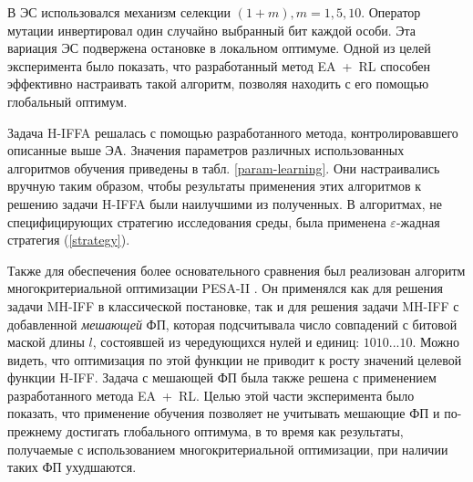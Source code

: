 В ЭС использовался механизм селекции $(1 + m), m = 1, 5, 10.$ Оператор мутации инвертировал один случайно выбранный бит каждой особи. Эта вариация ЭС подвержена остановке в локальном оптимуме. Одной из целей эксперимента было показать, что разработанный метод EA~+~RL способен эффективно настраивать такой алгоритм, позволяя находить с его помощью глобальный оптимум.

Задача H-IFFA решалась с помощью разработанного метода, контролировавшего описанные выше ЭА. Значения параметров различных использованных алгоритмов обучения приведены в табл. \ref{param-learning}. Они настраивались вручную таким образом, чтобы результаты применения этих алгоритмов к решению задачи H-IFFA были наилучшими из полученных. В алгоритмах, не специфицирующих стратегию исследования среды, была применена $\varepsilon$-жадная стратегия (\ref{strategy}).

Также для обеспечения более основательного сравнения был реализован алгоритм многокритериальной оптимизации PESA-II \cite{pesa-ii}. Он применялся как для решения задачи MH-IFF в классической постановке, так и для решения задачи MH-IFF с добавленной \emph{мешающей} ФП, которая подсчитывала число совпадений с битовой маской длины $l$, состоявшей из чередующихся нулей и единиц: $1010...10$. Можно видеть, что оптимизация по этой функции не приводит к росту значений целевой функции H-IFF. Задача с мешающей ФП была также решена с применением разработанного метода EA~+~RL. Целью этой части эксперимента было показать, что применение обучения позволяет не учитывать мешающие ФП и по-прежнему достигать глобального оптимума, в то время как результаты, получаемые с использованием многокритериальной оптимизации, при наличии таких ФП ухудшаются.

